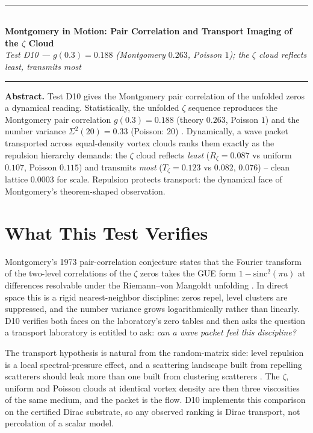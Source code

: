 \documentclass[11pt,a4paper]{article}
\begin{document}
\\[0.3em]
\rule{\textwidth}{0.8pt}\\[0.6em]
{\LARGE\bfseries\color{labblue} Montgomery in Motion: Pair Correlation and Transport Imaging of the $\zeta$ Cloud}\\[0.5em]
{\normalsize\itshape Test D10 — $g(0.3) = 0.188$ (Montgomery $0.263$, Poisson $1$); the $\zeta$ cloud reflects least, transmits most}\\[0.4em]
\rule{\textwidth}{0.4pt}

\begin{tcolorbox}[colback=labgreen!8, colframe=labgreen!70!black, title={Verdict: PASS — 9/9 checks}, fonttitle=\bfseries, boxrule=0.6pt]
\textbf{Abstract.} Test D10 gives the Montgomery pair correlation of the unfolded zeros a dynamical reading. Statistically, the unfolded $\zeta$ sequence reproduces the Montgomery pair correlation $g(0.3) = 0.188$ (theory $0.263$, Poisson $1$) and the number variance $\Sigma^2(20) = 0.33$ (Poisson: $20$) \cite{montgomery}. Dynamically, a wave packet transported across equal-density vortex clouds ranks them exactly as the repulsion hierarchy demands: the $\zeta$ cloud reflects \emph{least} ($R_\zeta = 0.087$ vs uniform $0.107$, Poisson $0.115$) and transmits \emph{most} ($T_\zeta = 0.123$ vs $0.082$, $0.076$) -- clean lattice $0.0003$ for scale. Repulsion protects transport: the dynamical face of Montgomery's theorem-shaped observation.
\end{tcolorbox}

\section{What This Test Verifies}
Montgomery's 1973 pair-correlation conjecture states that the Fourier transform of the two-level correlations of the $\zeta$ zeros takes the GUE form $1 - \mathrm{sinc}^2(\pi u)$ at differences resolvable under the Riemann--von Mangoldt unfolding \cite{montgomery}. In direct space this is a rigid nearest-neighbor discipline: zeros repel, level clusters are suppressed, and the number variance grows logarithmically rather than linearly. D10 verifies both faces on the laboratory's zero tables and then asks the question a transport laboratory is entitled to ask: \emph{can a wave packet feel this discipline?}

The transport hypothesis is natural from the random-matrix side: level repulsion is a local spectral-pressure effect, and a scattering landscape built from repelling scatterers should leak more than one built from clustering scatterers \cite{guhr}. The $\zeta$, uniform and Poisson clouds at identical vortex density are then three viscosities of the same medium, and the packet is the flow. D10 implements this comparison on the certified Dirac substrate, so any observed ranking is Dirac transport, not percolation of a scalar model.
\end{document}
